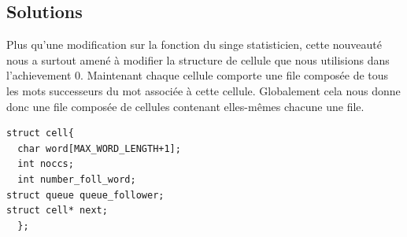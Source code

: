 \documentclass[12pt]{article}
\begin{document}
\subsection{Solutions}
Plus qu'une modification sur la fonction du singe statisticien,
cette nouveauté nous a surtout amené à modifier la structure de cellule que nous utilisions dans l'achievement 0. Maintenant chaque cellule comporte une file composée de tous les mots successeurs du mot associée à cette cellule. Globalement cela nous donne donc une file composée de cellules contenant elles-mêmes chacune une file.
\bigbreak
\begin{lstlisting}
struct cell{
  char word[MAX_WORD_LENGTH+1];
  int noccs;                                                                        
  int number_foll_word;                                                                struct queue queue_follower;                                                       struct cell* next;
  };                                                                                
\end{lstlisting}
\bigbreak
\end{document}
